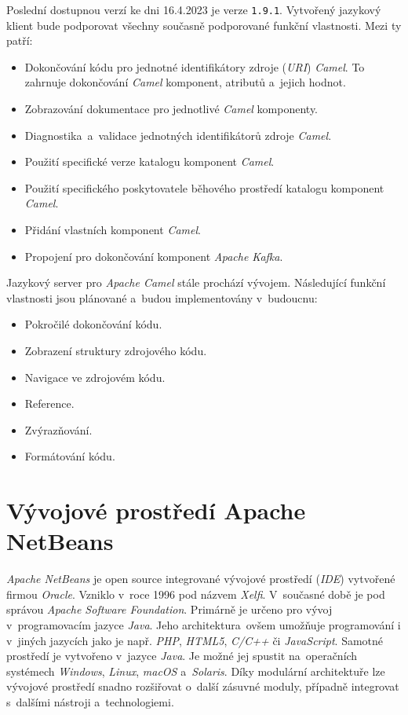 Poslední dostupnou verzí ke dni 16.4.2023 je verze \texttt{1.9.1}. Vytvořený jazykový klient bude podporovat všechny současně podporované funkční vlastnosti. Mezi ty patří:
\begin{itemize}
    \item Dokončování kódu pro jednotné identifikátory zdroje (\emph{URI}) \emph{Camel}. To zahrnuje dokončování \emph{Camel} komponent, atributů a~jejich hodnot.
    \item Zobrazování dokumentace pro jednotlivé \emph{Camel} komponenty. 
    \item Diagnostika~a~validace jednotných identifikátorů zdroje \emph{Camel}.
    \item Použití specifické verze katalogu komponent \emph{Camel}.
    \item Použití specifického poskytovatele běhového prostředí katalogu komponent \emph{Camel}.
    \item Přidání vlastních komponent \emph{Camel}.
    \item Propojení pro dokončování komponent \emph{Apache Kafka}.
\end{itemize}
Jazykový server pro \emph{Apache Camel} stále prochází vývojem. Následující funkční vlastnosti jsou plánované a~budou implementovány v~budoucnu:
\begin{itemize}
    \item Pokročilé dokončování kódu.
    \item Zobrazení struktury zdrojového kódu.
    \item Navigace ve zdrojovém kódu.
    \item Reference.
    \item Zvýrazňování.
    \item Formátování kódu.
\end{itemize}

\chapter{Vývojové prostředí Apache NetBeans}
\label{netbeansIDE}
\emph{Apache NetBeans} je open source integrované vývojové prostředí (\emph{IDE}) vytvořené firmou \emph{Oracle}. Vzniklo v~roce 1996 pod názvem \emph{Xelfi}. V~současné době je pod správou \emph{Apache Software Foundation}. Primárně je určeno pro vývoj v~programovacím jazyce \emph{Java}. Jeho architektura~ovšem umožňuje programování i v~jiných jazycích jako je např. \emph{PHP}, \emph{HTML5}, \emph{C/C++} či \emph{JavaScript}. Samotné prostředí je vytvořeno v~jazyce \emph{Java}. Je možné jej spustit na~operačních systémech \emph{Windows}, \emph{Linux}, \emph{macOS} a~\emph{Solaris}. Díky modulární architektuře lze vývojové prostředí snadno rozšiřovat o~další zásuvné moduly, případně integrovat s~dalšími nástroji a~technologiemi. 

